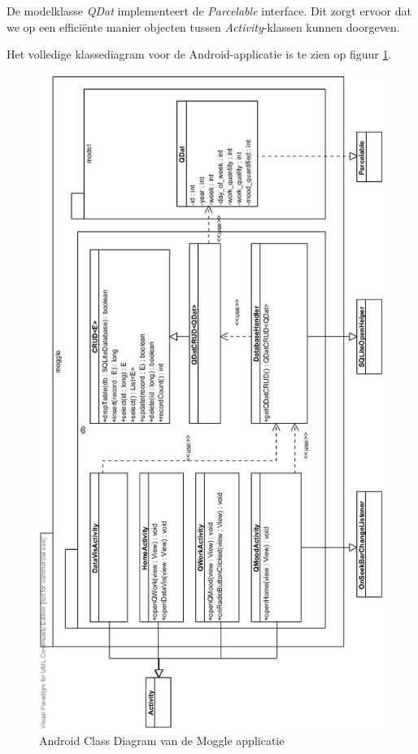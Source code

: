 De modelklasse \textit{QDat} implementeert de \textit{Parcelable} interface. Dit zorgt ervoor dat we op een effici\"ente manier objecten tussen \textit{Activity}-klassen kunnen doorgeven.

Het volledige klassediagram voor de Android-applicatie is te zien op figuur \ref{fig:android_classdiagram}.

\begin{figure}
  \begin{center}
  \includegraphics[scale=0.7]{data/diagram-android}
	\end{center}
  \caption{Android Class Diagram van de Moggle applicatie}
  \label{fig:android_classdiagram}
\end{figure}


